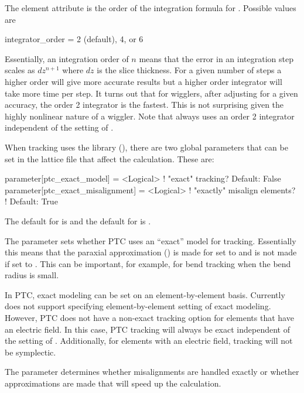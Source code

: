 The  element attribute is the order of the integration formula for
. Possible values are
\begin{example}
  integrator_order = 2 (default), 4, or 6
\end{example}
Essentially, an integration order of $n$ means that the error in an integration step scales as
$dz^{n+1}$ where $dz$ is the slice thickness.  For a given number of steps a higher order will give
more accurate results but a higher order integrator will take more time per step. It turns out that
for wigglers, after adjusting  for a given accuracy, the order 2 integrator is the
fastest. This is not surprising given the highly nonlinear nature of a wiggler. Note that
 always uses an order 2 integrator independent of the setting of
.

When tracking uses the  library (), there are two global parameters that
can be set in the lattice file that affect the calculation. These are:
\begin{example}
  parameter[ptc_exact_model]        = <Logical>  ! "exact" tracking? Default: False
  parameter[ptc_exact_misalignment] = <Logical>  ! "exactly" misalign elements? 
                                                 !    Default: True
\end{example}
The default for  is  and the default for
 is . 

The  parameter sets whether PTC uses an ``exact'' model for
tracking. Essentially this means that the paraxial approximation () is made
for  set to  and is not made if set to . This can be
important, for example, for bend tracking when the bend radius is small.

In PTC, exact modeling can be set on an element-by-element basis. Currently \bmad does not support
specifying element-by-element setting of exact modeling. However, PTC does not have a non-exact
tracking option for elements that have an electric field. In this case, PTC tracking will always be
exact independent of the setting of .  Additionally, for elements with an
electric field, tracking will not be symplectic.

The  parameter determines whether misalignments are handled exactly or
whether approximations are made that will speed up the calculation.

